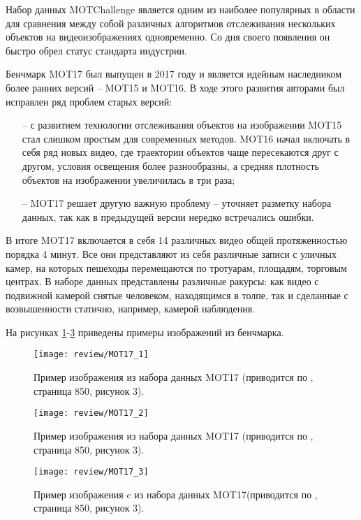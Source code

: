 Набор данных MOTChallenge \cite{dendorfer2021motchallenge} является одним из наиболее популярных в области для сравнения между собой различных алгоритмов отслеживания нескольких объектов на видеоизображениях одновременно. 
Со дня своего появления он быстро обрел статус стандарта индустрии. 

Бенчмарк MOT17 был выпущен в 2017 году и является идейным наследником более ранних версий -- MOT15 и MOT16. В ходе этого развития авторами был исправлен ряд проблем старых версий:
\begin{itemize}
    \item[--] с развитием технологии отслеживания объектов на изображении MOT15 стал слишком простым для современных методов. MOT16 начал включать в себя ряд новых видео, где траектории объектов чаще пересекаются друг с другом, условия освещения более разнообразны, а средняя плотность объектов на изображении увеличилась в три раза;
    \item[--] MOT17 решает другую важную проблему -- уточняет разметку набора данных, так как в предыдущей версии нередко встречались ошибки. 
\end{itemize}

В итоге MOT17 включается в себя 14 различных видео общей протяженностью порядка 4 минут. Все они представляют из себя различные записи с уличных камер, на которых пешеходы перемещаются по тротуарам, площадям, торговым центрах. 
В наборе данных представлены различные ракурсы: как видео с подвижной камерой снятые человеком, находящимся в толпе, так и сделанные с возвышенности статично, например, камерой наблюдения.

На рисунках \ref{fig:mot_1}-\ref{fig:mot_3} приведены примеры изображений из бенчмарка.

\begin{figure}[ht]
    \centering
    \texttt{[image: review/MOT17\_1]}
    \caption{Пример изображения из набора данных MOT17 (приводится по \cite{dendorfer2021motchallenge}, страница 850, рисунок 3).}
    \label{fig:mot_1}
\end{figure}

\begin{figure}[ht]
    \centering
    \texttt{[image: review/MOT17\_2]}
    \caption{Пример изображения из набора данных MOT17 (приводится по \cite{dendorfer2021motchallenge}, страница 850, рисунок 3).}
    \label{fig:mot_2}
\end{figure}

\begin{figure}[ht]
    \centering
    \texttt{[image: review/MOT17\_3]}
    \caption{Пример изображения c из набора данных MOT17(приводится по \cite{dendorfer2021motchallenge}, страница 850, рисунок 3).}
    \label{fig:mot_3}
\end{figure}

\FloatBarrier